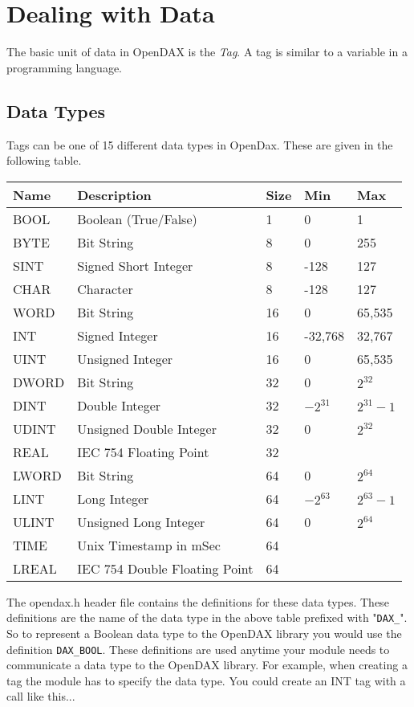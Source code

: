 \chapter{Dealing with Data}
The basic unit of data in OpenDAX is the \textit{Tag}.  A tag is similar to a variable in a programming language.
\section{Data Types}
Tags can be one of 15 different data types in OpenDax.  These are given in the following table.

\begin{tabular}{|l|l|l|l|l|}
\hline \textbf{Name} & \textbf{Description} & \textbf{Size} & \textbf{Min} & \textbf{Max} \\
\hline BOOL & Boolean (True/False) & 1 & 0 & 1 \\
\hline BYTE & Bit String & 8 & 0 & 255 \\
\hline SINT & Signed Short Integer & 8 & -128 & 127 \\
\hline CHAR & Character & 8 & -128 & 127 \\
\hline WORD & Bit String & 16 & 0 & 65,535 \\
\hline INT & Signed Integer & 16 & -32,768 & 32,767 \\
\hline UINT & Unsigned Integer & 16 & 0 & 65,535 \\
\hline DWORD & Bit String & 32 & 0 & $2^{32}$ \\
\hline DINT & Double Integer & 32 & $-2^{31}$ & $2^{31}-1$ \\
\hline UDINT & Unsigned Double Integer & 32 & 0 & $2^{32}$ \\
\hline REAL & IEC 754 Floating Point & 32 &  &  \\
\hline LWORD & Bit String & 64 & 0 & $2^{64}$ \\
\hline LINT & Long Integer & 64 & $-2^{63}$ & $2^{63}-1$ \\
\hline ULINT & Unsigned Long Integer & 64 & 0 & $2^{64}$ \\
\hline TIME & Unix Timestamp in mSec & 64 &  &  \\
\hline LREAL & IEC 754 Double Floating Point & 64 &  &  \\
\hline 
\end{tabular}
 
The opendax.h header file contains the definitions for these data types.  These definitions are the name of the data type in the above table prefixed with "\texttt{DAX\_}".  So to represent a Boolean data type to the OpenDAX library you would use the definition \texttt{DAX\_BOOL}.  These definitions are used anytime your module needs to communicate a data type to the OpenDAX library.  For example, when creating a tag the module has to specify the data type.  You could create an INT tag with a call like this...

